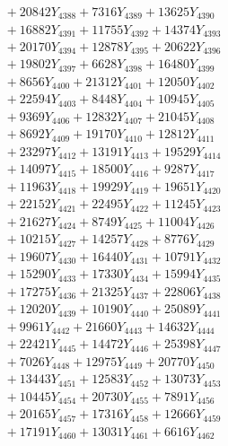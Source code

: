 \documentclass[a4paper,10pt]{article}
\begin{document}
{\begin{align}
&\;  + 20842 Y_{4388} + 7316 Y_{4389} + 13625 Y_{4390} \\[0.3ex]
&\;  + 16882 Y_{4391} + 11755 Y_{4392} + 14374 Y_{4393} \\[0.3ex]
&\;  + 20170 Y_{4394} + 12878 Y_{4395} + 20622 Y_{4396} \\[0.3ex]
&\;  + 19802 Y_{4397} + 6628 Y_{4398} + 16480 Y_{4399} \\[0.3ex]
&\;  + 8656 Y_{4400} + 21312 Y_{4401} + 12050 Y_{4402} \\[0.3ex]
&\;  + 22594 Y_{4403} + 8448 Y_{4404} + 10945 Y_{4405} \\[0.3ex]
&\;  + 9369 Y_{4406} + 12832 Y_{4407} + 21045 Y_{4408} \\[0.5ex]\allowbreak
&\;  + 8692 Y_{4409} + 19170 Y_{4410} + 12812 Y_{4411} \\[0.3ex]
&\;  + 23297 Y_{4412} + 13191 Y_{4413} + 19529 Y_{4414} \\[0.3ex]
&\;  + 14097 Y_{4415} + 18500 Y_{4416} + 9287 Y_{4417} \\[0.3ex]
&\;  + 11963 Y_{4418} + 19929 Y_{4419} + 19651 Y_{4420} \\[0.3ex]
&\;  + 22152 Y_{4421} + 22495 Y_{4422} + 11245 Y_{4423} \\[0.3ex]
&\;  + 21627 Y_{4424} + 8749 Y_{4425} + 11004 Y_{4426} \\[0.3ex]
&\;  + 10215 Y_{4427} + 14257 Y_{4428} + 8776 Y_{4429} \\[0.3ex]
&\;  + 19607 Y_{4430} + 16440 Y_{4431} + 10791 Y_{4432} \\[0.3ex]
&\;  + 15290 Y_{4433} + 17330 Y_{4434} + 15994 Y_{4435} \\[0.3ex]
&\;  + 17275 Y_{4436} + 21325 Y_{4437} + 22806 Y_{4438} \\[0.5ex]\allowbreak
&\;  + 12020 Y_{4439} + 10190 Y_{4440} + 25089 Y_{4441} \\[0.3ex]
&\;  + 9961 Y_{4442} + 21660 Y_{4443} + 14632 Y_{4444} \\[0.3ex]
&\;  + 22421 Y_{4445} + 14472 Y_{4446} + 25398 Y_{4447} \\[0.3ex]
&\;  + 7026 Y_{4448} + 12975 Y_{4449} + 20770 Y_{4450} \\[0.3ex]
&\;  + 13443 Y_{4451} + 12583 Y_{4452} + 13073 Y_{4453} \\[0.3ex]
&\;  + 10445 Y_{4454} + 20730 Y_{4455} + 7891 Y_{4456} \\[0.3ex]
&\;  + 20165 Y_{4457} + 17316 Y_{4458} + 12666 Y_{4459} \\[0.3ex]
&\;  + 17191 Y_{4460} + 13031 Y_{4461} + 6616 Y_{4462} \\[0.3ex]

\end{align}}
\end{document}
